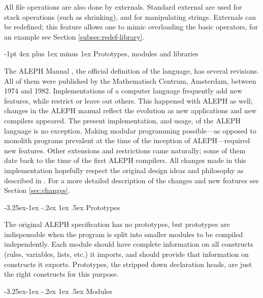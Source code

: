 \documentclass[titlepage]{article}
\makeatletter
\newcommand\A{\textsf{ALEPH}}
\renewcommand\subsection{%
\@startsection{subsection}{2}{\z@}%
   {-3.25ex\@plus -1ex \@minus -.2ex}%
   {1ex \@plus .5ex}%
   {\normalfont\normalsize\bfseries}}
\renewcommand\section{%
\newpage
\@startsection{section}{1}{\z@}%
   {-1pt}%
   {4ex plus 1ex minus 1ex}%
   {\normalfont\Large\bfseries}}
\let\osection\section
\def\section {\newpage\osection}
\makeatother
\begin{document}
All file operations are also done by externals. Standard external are used
for stack operations (such as shrinking), and for manipulating strings.
Externals can be redefined; this feature allows one to mimic overloading the
basic operators, for an example see Section \ref{subsec:redef-library}.


\section{Prototypes, modules and libraries}

The \A{} Manual \cite{A-manual}, the official definition of the language,
has several revisions. All of them were published by the Mathematisch
Centrum, Amsterdam, between 1974 and 1982. Implementations of a computer
language frequently add new features, while restrict or leave out others.
This happened with \A{} as well; changes in the \A{} manual reflect the
evolution as new applications and new compilers appeared. The present
implementation, and usage, of the \A{} language is no exception. Making
modular programming possible---as opposed to monolith programs
prevalent at the time of the inception of \A---required new features. Other
extensions and restrictions came naturally; some of them date back to the
time of the first \A{} compilers. All changes made in this implementation
hopefully respect the original design ideas and philosophy as described in
\cite{grune}. For a more detailed description of the changes and new features see
Section \ref{sec:changes}.

\subsection{Prototypes}

The original \A{} specification has no prototypes, but prototypes are
indispensable when the program is split into smaller modules to be
compiled independently. Each module should have complete information on all
constructs (rules, variables, lists, etc.) it imports, and should
provide that information on constructs it exports. Prototypes, the stripped
down declaration heads, are just the right constructs for this purpose.

\subsection{Modules}\label{subsec:general-modules}
\end{document}
